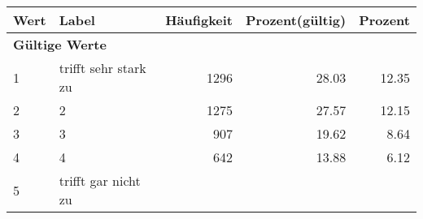      \begin{longtable}{lXrrr}
     \toprule
     \textbf{Wert} & \textbf{Label} & \textbf{Häufigkeit} & \textbf{Prozent(gültig)} & \textbf{Prozent} \\
     \endhead
     \midrule
     \multicolumn{5}{l}{\textbf{Gültige Werte}}\\

     1 &
     \multicolumn{1}{X}{ trifft sehr stark zu   } &


       \num{1296} &
       \num[round-mode=places,round-precision=2]{28.03} &
         \num[round-mode=places,round-precision=2]{12.35} \\

     2 &
     \multicolumn{1}{X}{ 2   } &


       \num{1275} &
       \num[round-mode=places,round-precision=2]{27.57} &
         \num[round-mode=places,round-precision=2]{12.15} \\

     3 &
     \multicolumn{1}{X}{ 3   } &


       \num{907} &
       \num[round-mode=places,round-precision=2]{19.62} &
         \num[round-mode=places,round-precision=2]{8.64} \\

     4 &
     \multicolumn{1}{X}{ 4   } &


       \num{642} &
       \num[round-mode=places,round-precision=2]{13.88} &
         \num[round-mode=places,round-precision=2]{6.12} \\

     5 &
     \multicolumn{1}{X}{ trifft gar nicht zu   } &



\end{longtable}

